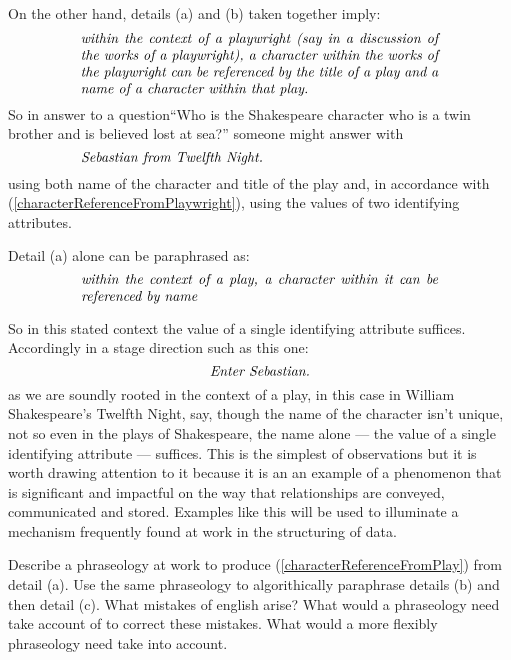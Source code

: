 \begin{oldtt}
\mynote %
On the other hand, details (a) and (b) taken together imply: 
\begin{equation}
\label{characterReferenceFromPlaywright}
\text{\parbox{9cm}{\textit{within the context of a playwright
(say in a discussion of the works of a playwright), 
a character within the works of the playwright 
can be referenced by the title of a play 
and a name of a character within that play. }}}
\end{equation}
So in answer to a question``Who is the Shakespeare character who is a twin brother and is believed lost at sea?''
someone might answer with 
\begin{equation*}
\label{antonioReferenceFromPlaywright}
\text{\parbox{9cm}{\textit{Sebastian from Twelfth Night. }}}\\
\end{equation*}
using both name of the character and title of the play and, 
in accordance with (\ref{characterReferenceFromPlaywright}),
using the values of two identifying attributes.

\mynote %
Detail (a) alone can be paraphrased as: 
\begin{equation}
\label{characterReferenceFromPlay}
\text{\parbox{9cm}{\textit{within the context of a play, a character within it can be referenced by name}}}\\
\end{equation}

So in this stated context the value of a single identifying attribute suffices. 
Accordingly in a stage direction such as this one:  
\begin{equation*}
\text{\textit{Enter Sebastian.}}
\end{equation*}
as we are soundly rooted in the context of a play, in this case in William Shakespeare's Twelfth Night, say,
though the name of the character isn't unique, not so even in the plays of Shakespeare, the name alone
 --- the value of a single identifying attribute --- suffices.
This is the simplest of observations
but it is worth drawing attention to it  
because it is an an example of a phenomenon  that is significant
and impactful on the way that 
relationships are conveyed, communicated and stored.
Examples like this will be used to illuminate a  mechanism frequently found at work in the structuring of data.

\begin{exerciseforreader}
Describe a phraseology 
at work to produce  (\ref{characterReferenceFromPlay}) from detail (a). 
Use the same phraseology to algorithically paraphrase details (b) and then detail (c).
What mistakes of english arise?
What would a phraseology need take account of to correct these mistakes.
What would a more flexibly phraseology need take into account.
\end{exerciseforreader}
\end{oldtt}
\fi
